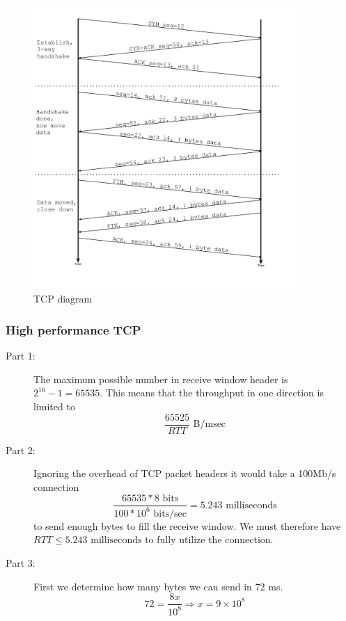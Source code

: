 \begin{description}
\begin{figure}[!h]
        \includegraphics[width=10cm]{131p3-pic}
        \caption{TCP diagram}
        \end{figure}
\end{description}

\subsubsection{High performance TCP}
\begin{description}
    \item[Part 1:] The maximum possible number in receive window header is $2^{16}-1 = 65535$. This means that the throughput in one
        direction is limited to \[\frac{65525}{RTT} \text{ B/msec}\] %
    \item[Part 2:] Ignoring the overhead of TCP packet headers it would take a 100Mb/s connection
        \[ \frac{65535 * 8 \text{ bits}}{100 * 10^{6} \text{ bits/sec}} = 5.243 \text{ milliseconds} \]
        to send enough bytes to fill the receive window. We must therefore have $RTT \leq 5.243 \text{ milliseconds}$ to fully utilize
        the connection. %
    \item[Part 3:] First we determine how many bytes we can send in 72 ms. $$72=\frac{8x}{10^8} \Rightarrow x = 9 \times 10^8$$ 

\end{description}

